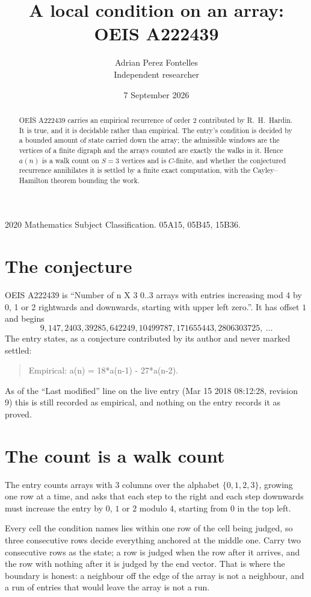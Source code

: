 \documentclass[11pt,a4paper]{article}
\title{A local condition on an array: OEIS A222439}
\author{Adrian Perez Fontelles\\ \small Independent researcher}
\date{7 September 2026}
\theoremstyle{plain}
\theoremstyle{definition}
\begin{document}
\maketitle

\begin{abstract}
OEIS A222439 carries an empirical recurrence of order $2$ contributed by R.~H.~Hardin. It is
true, and it is decidable rather than empirical. The entry's condition is decided by a bounded amount of state carried down the array; the
admissible windows are the vertices of a finite digraph and the arrays counted are exactly the
walks in it. Hence $a(n)$ is a walk count on $S=3$ vertices and is $C$-finite, and whether the
conjectured recurrence annihilates it is settled by a finite exact computation, with the
Cayley--Hamilton theorem bounding the work.
\end{abstract}

\noindent\small 2020 Mathematics Subject Classification. 05A15, 05B45, 15B36.\normalsize

\section{The conjecture}

OEIS A222439 is ``Number of n X 3 0..3 arrays with entries increasing mod 4 by 0, 1 or 2 rightwards and downwards, starting with upper left zero.''. It has offset $1$ and begins
\[
9, 147, 2403, 39285, 642249, 10499787, 171655443, 2806303725,\ \dots
\]
The entry states, as a conjecture contributed by its author and never marked settled:
\begin{quote}
Empirical: a(n) = 18*a(n-1) - 27*a(n-2).
\end{quote}
As of the ``Last modified'' line on the live entry (Mar 15 2018 08:12:28, revision 9) this is still
recorded as empirical, and nothing on the entry records it as proved.

\section{The count is a walk count}

The entry counts arrays with $3$ columns over the alphabet $\{0,1,2,3\}$, growing one row at a time, and asks that each step to the right and each step downwards must increase the entry by $0$, $1$ or $2$ modulo $4$, starting from $0$ in the top left.

Every cell the condition names lies within one row of the cell being judged, so three consecutive rows decide everything anchored at the middle one. Carry two consecutive rows as the state; a row is judged when the row after it arrives, and the row with nothing after it is judged by the end vector. That is where the boundary is honest: a neighbour off the edge of the array is not a neighbour, and a run of entries that would leave the array is not a run.
\end{document}
